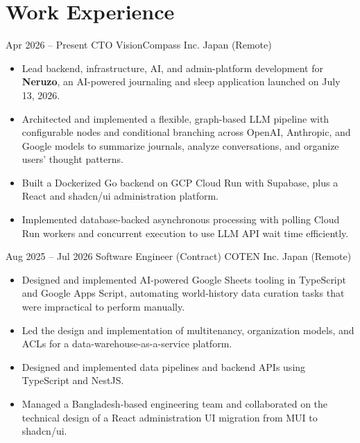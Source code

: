 \documentclass[11pt,letterpaper]{moderncv}
\begin{document}
\section{Work Experience}
\cventry
    {Apr 2026 -- Present}
    {CTO}
    {VisionCompass Inc.}
    {Japan (Remote)}
    {}
    {
      \begin{itemize}
        \item Lead backend, infrastructure, AI, and admin-platform development for \textbf{Neruzo}, an AI-powered journaling and sleep application launched on July 13, 2026.
        \item Architected and implemented a flexible, graph-based LLM pipeline with configurable nodes and conditional branching across OpenAI, Anthropic, and Google models to summarize journals, analyze conversations, and organize users' thought patterns.
        \item Built a Dockerized Go backend on GCP Cloud Run with Supabase, plus a React and shadcn/ui administration platform.
        \item Implemented database-backed asynchronous processing with polling Cloud Run workers and concurrent execution to use LLM API wait time efficiently.
      \end{itemize}
    }

\cventry
    {Aug 2025 -- Jul 2026}
    {Software Engineer (Contract)}
    {COTEN Inc.}
    {Japan (Remote)}
    {}
    {
      \begin{itemize}
        \item Designed and implemented AI-powered Google Sheets tooling in TypeScript and Google Apps Script, automating world-history data curation tasks that were impractical to perform manually.
        \item Led the design and implementation of multitenancy, organization models, and ACLs for a data-warehouse-as-a-service platform.
        \item Designed and implemented data pipelines and backend APIs using TypeScript and NestJS.
        \item Managed a Bangladesh-based engineering team and collaborated on the technical design of a React administration UI migration from MUI to shadcn/ui.
      \end{itemize}
    }
\end{document}
